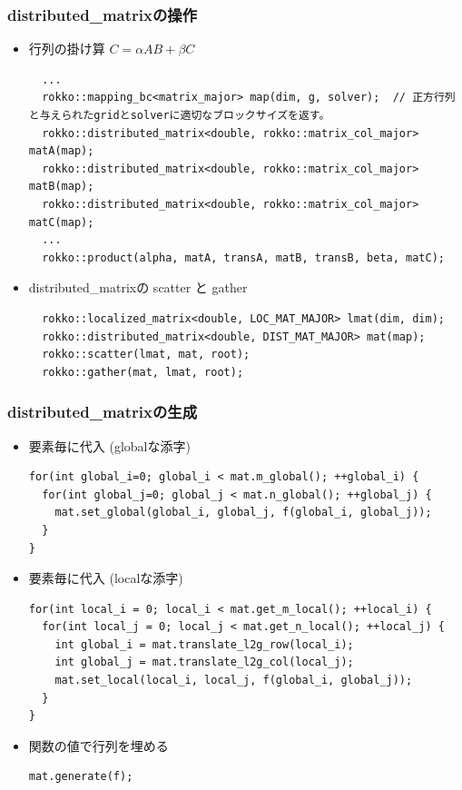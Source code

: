 \begin{frame}[c,fragile]
  \frametitle{distributed\_matrixの操作}
  \begin{itemize}
  \item 行列の掛け算 $C = \alpha A B + \beta C$
\begin{lstlisting}
  ...
  rokko::mapping_bc<matrix_major> map(dim, g, solver);  // 正方行列と与えられたgridとsolverに適切なブロックサイズを返す。
  rokko::distributed_matrix<double, rokko::matrix_col_major> matA(map);
  rokko::distributed_matrix<double, rokko::matrix_col_major> matB(map);
  rokko::distributed_matrix<double, rokko::matrix_col_major> matC(map);
  ...
  rokko::product(alpha, matA, transA, matB, transB, beta, matC);
\end{lstlisting}
  \item distributed\_matrixの scatter と gather
\begin{lstlisting}
  rokko::localized_matrix<double, LOC_MAT_MAJOR> lmat(dim, dim);
  rokko::distributed_matrix<double, DIST_MAT_MAJOR> mat(map);
  rokko::scatter(lmat, mat, root);
  rokko::gather(mat, lmat, root);
\end{lstlisting}
  \end{itemize}
\end{frame}

\begin{frame}[c,fragile]
  \frametitle{distributed_matrixの生成}
  \begin{itemize}
  \item 要素毎に代入 (globalな添字)
\begin{lstlisting}
for(int global_i=0; global_i < mat.m_global(); ++global_i) {
  for(int global_j=0; global_j < mat.n_global(); ++global_j) {
    mat.set_global(global_i, global_j, f(global_i, global_j));
  }
}
\end{lstlisting}
  \item 要素毎に代入 (localな添字)
\begin{lstlisting}
for(int local_i = 0; local_i < mat.get_m_local(); ++local_i) {
  for(int local_j = 0; local_j < mat.get_n_local(); ++local_j) {
    int global_i = mat.translate_l2g_row(local_i);
    int global_j = mat.translate_l2g_col(local_j);
    mat.set_local(local_i, local_j, f(global_i, global_j));
  }
}
\end{lstlisting}
  \item 関数の値で行列を埋める
\begin{lstlisting}
mat.generate(f);
\end{lstlisting}
  \end{itemize}
\end{frame}

